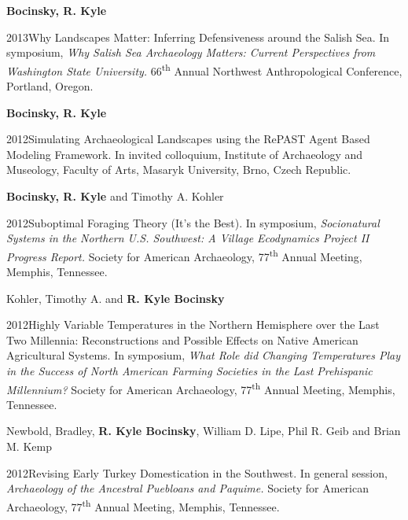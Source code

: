 {\bf Bocinsky, R. Kyle}
\nopagebreak
\begin{list1}
\item[] 2013\hspace{.2cm}Why Landscapes Matter: Inferring Defensiveness around the Salish Sea. In symposium, \emph{Why Salish Sea Archaeology Matters: Current Perspectives from Washington State University.} 66\textsuperscript{th} Annual Northwest Anthropological Conference, Portland, Oregon.
\end{list1}


{\bf Bocinsky, R. Kyle}
\nopagebreak
\begin{list1}
\item[] 2012\hspace{.2cm}Simulating Archaeological Landscapes using the RePAST Agent Based Modeling Framework. In invited colloquium, Institute of Archaeology and Museology, Faculty of Arts, Masaryk University, Brno, Czech Republic.
\end{list1}


{\bf Bocinsky, R. Kyle} and Timothy A. Kohler
\nopagebreak
\begin{list1}
\item[] 2012\hspace{.2cm}Suboptimal Foraging Theory (It's the Best). In symposium, \emph{Socionatural Systems in the Northern U.S. Southwest: A Village Ecodynamics Project II Progress Report.} Society for American Archaeology, 77\textsuperscript{th} Annual Meeting, Memphis, Tennessee.
\end{list1}


Kohler, Timothy A. and {\bf R. Kyle Bocinsky}
\nopagebreak
\begin{list1}
\item[] 2012\hspace{.2cm}Highly Variable Temperatures in the Northern Hemisphere over the Last Two Millennia: Reconstructions and Possible Effects on Native American Agricultural Systems. In symposium, \emph{What Role did Changing Temperatures Play in the Success of North American Farming Societies in the Last Prehispanic Millennium?} Society for American Archaeology, 77\textsuperscript{th} Annual Meeting, Memphis, Tennessee.
\end{list1}


Newbold, Bradley, {\bf R. Kyle Bocinsky}, William D. Lipe, Phil R. Geib and Brian M. Kemp
\nopagebreak
\begin{list1}
\item[] 2012\hspace{.2cm}Revising Early Turkey Domestication in the Southwest. In general session, \emph{Archaeology of the Ancestral Puebloans and Paquime.} Society for American Archaeology, 77\textsuperscript{th} Annual Meeting, Memphis, Tennessee.
\end{list1}


